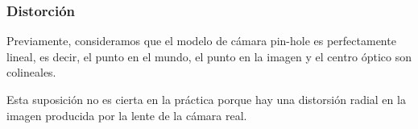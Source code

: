 \fi

\begin{frame}
	\frametitle{Distorción}
	
	\footnotesize
	
	Previamente, consideramos que el modelo de cámara pin-hole es perfectamente lineal, es decir, el punto en el mundo, el punto en la imagen y el centro óptico son colineales.
	
	Esta suposición no es cierta en la práctica porque hay una distorsión radial en la imagen producida por la lente de la cámara real.
	
	\begin{figure}[!h]
		\centering
	\end{figure}
	
\end{frame}


